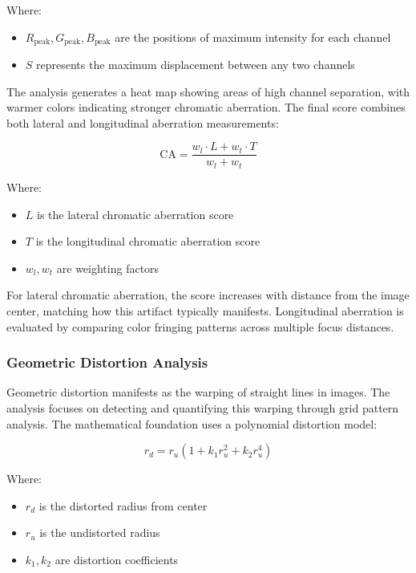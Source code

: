 Where:
\begin{itemize}
    \item \( R_{\text{peak}}, G_{\text{peak}}, B_{\text{peak}} \) are the positions of maximum intensity for each channel
    \item \( S \) represents the maximum displacement between any two channels
\end{itemize}

The analysis generates a heat map showing areas of high channel separation, with warmer colors indicating stronger chromatic aberration. The final score combines both lateral and longitudinal aberration measurements:

\begin{equation}
\text{CA} = \frac{w_l \cdot L + w_t \cdot T}{w_l + w_t}
\end{equation}

Where:
\begin{itemize}
    \item \( L \) is the lateral chromatic aberration score
    \item \( T \) is the longitudinal chromatic aberration score
    \item \( w_l, w_t \) are weighting factors
\end{itemize}

For lateral chromatic aberration, the score increases with distance from the image center, matching how this artifact typically manifests. Longitudinal aberration is evaluated by comparing color fringing patterns across multiple focus distances.

\subsubsection{Geometric Distortion Analysis}
Geometric distortion manifests as the warping of straight lines in images. The analysis focuses on detecting and quantifying this warping through grid pattern analysis. The mathematical foundation uses a polynomial distortion model:

\begin{equation}
r_d = r_u \left(1 + k_1 r_u^2 + k_2 r_u^4\right)
\end{equation}

Where:
\begin{itemize}
    \item \( r_d \) is the distorted radius from center
    \item \( r_u \) is the undistorted radius
    \item \( k_1, k_2 \) are distortion coefficients
\end{itemize}

